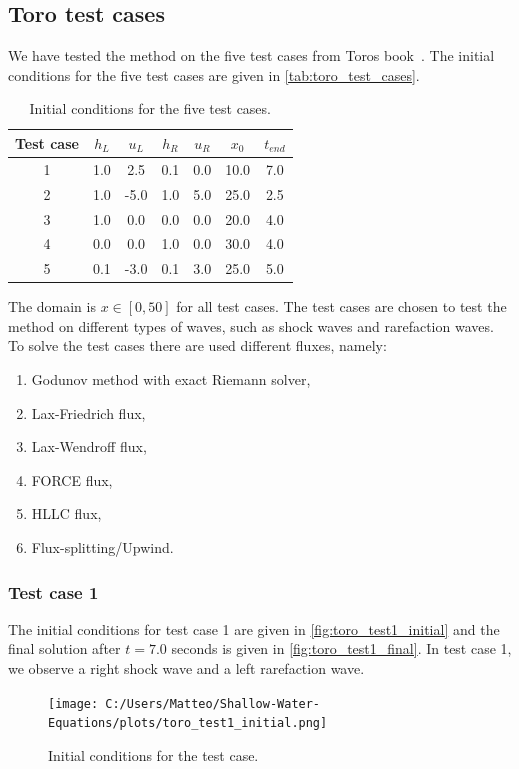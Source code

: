\subsection{Toro test cases}
We have tested the method on the five test cases from Toros book~\cite{Toro2001-Shock}.
The initial conditions for the five test cases are given in \autoref{tab:toro_test_cases}.
\begin{table}[H]
    \centering
    \begin{tabular}{c|c|c|c|c|c|c}
        \hline
        \textbf{Test case} & \textbf{$h_L$} & \textbf{$u_L$} & \textbf{$h_R$} & \textbf{$u_R$} & \textbf{$x_0$} & \textbf{$t_{end}$} \\
        \hline\hline
        1 & 1.0 & 2.5 & 0.1 & 0.0 & 10.0 & 7.0 \\
        2 & 1.0 & -5.0 & 1.0 & 5.0 & 25.0 & 2.5 \\
        3 & 1.0 & 0.0 & 0.0 & 0.0 & 20.0 & 4.0 \\
        4 & 0.0 & 0.0 & 1.0 & 0.0 & 30.0 & 4.0 \\
        5 & 0.1 & -3.0 & 0.1 & 3.0 & 25.0 & 5.0 \\
        \hline
    \end{tabular}
    \caption{Initial conditions for the five test cases.}
    \label{tab:toro_test_cases}
\end{table}
The domain is $x \in [0, 50]$ for all test cases.
The test cases are chosen to test the method on different types of waves, such as shock waves and rarefaction waves.
To solve the test cases there are used different fluxes, namely:
\begin{enumerate}
    \item Godunov method with exact Riemann solver,
    \item Lax-Friedrich flux,
    \item Lax-Wendroff flux,
    \item FORCE flux,
    \item HLLC flux,
    \item Flux-splitting/Upwind.
\end{enumerate}

\subsubsection{Test case 1}
The initial conditions for test case 1 are given in \autoref{fig:toro_test1_initial} and the final solution after $t=7.0$ seconds is given in \autoref{fig:toro_test1_final}.
In test case 1, we observe a right shock wave and a left rarefaction wave.
\begin{figure}[H]
    \centering
    \texttt{[image: C:/Users/Matteo/Shallow-Water-Equations/plots/toro\_test1\_initial.png]}
    \caption{Initial conditions for the test case.}\label{fig:toro_test1_initial}
\end{figure}

